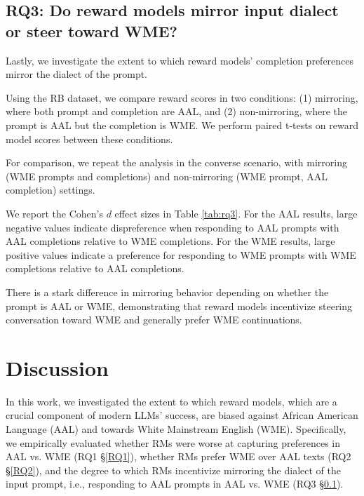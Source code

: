 \subsection{RQ3: Do reward models mirror input dialect or steer toward WME?}
\label{RQ3}

Lastly, we investigate the extent to which reward models' completion preferences mirror the dialect of the prompt.

Using the \textsc{RB} dataset, we compare reward scores in two conditions: (1) mirroring, where both prompt and completion are AAL, and (2) non-mirroring, where the prompt is AAL but the completion is WME. We perform paired t-tests on reward model scores between these conditions. 

For comparison, we repeat the analysis in the converse scenario, with mirroring (WME prompts and completions) and non-mirroring (WME prompt, AAL completion) settings.

We report the Cohen's $d$ effect sizes in Table \ref{tab:rq3}. For the AAL results, large negative values indicate dispreference when responding to AAL prompts with AAL completions relative to WME completions. For the WME results, large positive values indicate a preference for responding to WME prompts with WME completions relative to AAL completions. 

There is a stark difference in mirroring behavior depending on whether the prompt is AAL or WME, demonstrating that reward models incentivize steering conversation toward WME and generally prefer WME continuations. 


\section{Discussion}
In this work, we investigated the extent to which reward models, which are a crucial component of modern LLMs' success, are biased against African American Language (AAL) and towards White Mainstream English (WME).
Specifically, we empirically evaluated whether RMs were worse at capturing preferences in AAL vs. WME (RQ1 \S \ref{RQ1}), whether RMs prefer WME over AAL texts (RQ2 \S\ref{RQ2}), and the degree to which RMs incentivize mirroring the dialect of the input prompt, i.e., responding to AAL prompts in AAL vs. WME (RQ3 \S\ref{RQ3}).

